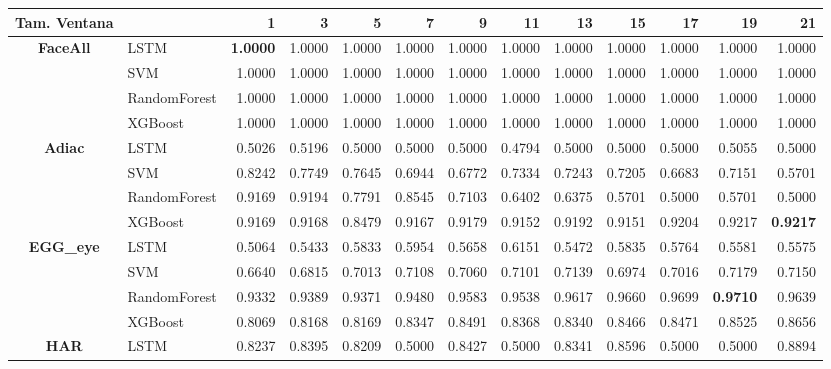 \begin{table}[h]
\centering
\begin{adjustbox}{max width=15cm}
\begin{tabular}{|c|l|r|r|r|r|r|r|r|r|r|r|r|}
	\hline
	\textbf{Tam. Ventana}&         &      1  &      3  &      5  &      7  &      9  &      11 &      13 &      15 &      17 &      19 &      21 \\
	\hline
	\textbf{FaceAll} & LSTM &  \textbf{1.0000} &  1.0000 &  1.0000 &  1.0000 &  1.0000 &  1.0000 &  1.0000 &  1.0000 &  1.0000 &  1.0000 &  1.0000 \\
	& SVM &  1.0000 &  1.0000 &  1.0000 &  1.0000 &  1.0000 &  1.0000 &  1.0000 &  1.0000 &  1.0000 &  1.0000 &  1.0000 \\
	& RandomForest &  1.0000 &  1.0000 &  1.0000 &  1.0000 &  1.0000 &  1.0000 &  1.0000 &  1.0000 &  1.0000 &  1.0000 &  1.0000 \\
	& XGBoost &  1.0000 &  1.0000 &  1.0000 &  1.0000 &  1.0000 &  1.0000 &  1.0000 &  1.0000 &  1.0000 &  1.0000 &  1.0000 \\
	\hline
	\textbf{Adiac} & LSTM &  0.5026 &  0.5196 &  0.5000 &  0.5000 &  0.5000 &  0.4794 &  0.5000 &  0.5000 &  0.5000 &  0.5055 &  0.5000 \\
	& SVM &  0.8242 &  0.7749 &  0.7645 &  0.6944 &  0.6772 &  0.7334 &  0.7243 &  0.7205 &  0.6683 &  0.7151 &  0.5701 \\
	& RandomForest &  0.9169 &  0.9194 &  0.7791 &  0.8545 &  0.7103 &  0.6402 &  0.6375 &  0.5701 &  0.5000 &  0.5701 &  0.5000 \\
	& XGBoost &  0.9169 &  0.9168 &  0.8479 &  0.9167 &  0.9179 &  0.9152 &  0.9192 &  0.9151 &  0.9204 &  0.9217 &  \textbf{0.9217} \\
	\hline
	\textbf{EGG\_eye} & LSTM &  0.5064 &  0.5433 &  0.5833 &  0.5954 &  0.5658 &  0.6151 &  0.5472 &  0.5835 &  0.5764 &  0.5581 &  0.5575 \\
	& SVM &  0.6640 &  0.6815 &  0.7013 &  0.7108 &  0.7060 &  0.7101 &  0.7139 &  0.6974 &  0.7016 &  0.7179 &  0.7150 \\
	& RandomForest &  0.9332 &  0.9389 &  0.9371 &  0.9480 &  0.9583 &  0.9538 &  0.9617 &  0.9660 &  0.9699 &  \textbf{0.9710} &  0.9639 \\
	& XGBoost &  0.8069 &  0.8168 &  0.8169 &  0.8347 &  0.8491 &  0.8368 &  0.8340 &  0.8466 &  0.8471 &  0.8525 &  0.8656 \\
	\hline
	\textbf{HAR} & LSTM &  0.8237 &  0.8395 &  0.8209 &  0.5000 &  0.8427 &  0.5000 &  0.8341 &  0.8596 &  0.5000 &  0.5000 &  0.8894 \\

\end{tabular}
\end{adjustbox}
\end{table}
